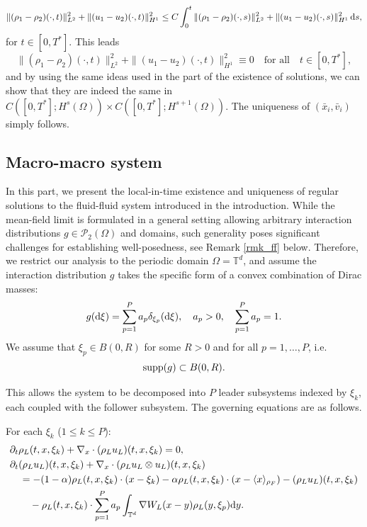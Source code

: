 \documentclass[10pt, reqno]{amsart}
\theoremstyle{definition}
\theoremstyle{remark}
\numberwithin{equation}{section}
\newcommand{\dy}{\textnormal{d}y}
\newcommand{\ds}{\textnormal{d}s}
\newcommand{\dxi}{\textnormal{d}\xi}
\newcommand{\calP}{\mathcal P}
\newcommand{\T}{\mathbb{T}}
\newcommand{\p}{\partial}
\begin{document}
\[
\|(\rho_1 - \rho_2)(\cdot,t)\|_{L^2}^2 + \|(u_1 - u_2)(\cdot,t)\|_{H^1}^2 \leq C\int_0^t \|(\rho_1 - \rho_2)(\cdot,s)\|_{L^2}^2 + \|(u_1 - u_2)(\cdot,s)\|_{H^1}^2\,\ds,
\] 
for $t \in [0,T^*]$. This leads
\[
\|(\rho_1 - \rho_2)(\cdot,t)\|_{L^2}^2 + \|(u_1 - u_2)(\cdot,t)\|_{H^1}^2 \equiv 0 \quad \mbox{for all} \quad t \in [0,T^*],
\]
and by using the same ideas used in the part of the existence of solutions, we can show that they are indeed the same in $C([0,T^*];H^s(\Omega)) \times C([0,T^*];H^{s+1}(\Omega))$. The uniqueness of $(\bar x_i, \bar v_i)$ simply follows. 


%
%
%
%
%
\subsection{Macro-macro system}\label{app_ffs}
In this part, we present the local-in-time existence and uniqueness of regular solutions to the fluid-fluid system introduced in the introduction. While the mean-field limit is formulated in a general setting allowing arbitrary interaction distributions $g \in \calP_2(\Omega)$ and domains, such generality poses significant challenges for establishing well-posedness, see Remark \ref{rmk_ff} below. Therefore, we restrict our analysis to the periodic domain $\Omega = \T^d$, and assume the interaction distribution $g$ takes the specific form of a convex combination of Dirac masses:
\begin{align*}
    g(\dxi) = \sum_{p=1}^P a_p \delta_{\xi_p}(\dxi), \quad a_p > 0, \quad \sum_{p=1}^P a_p = 1.
\end{align*}
We assume that $\xi_p \in B(0,R)$ for some $R>0$ and for all $p=1, \dots, P$, i.e.
\[
{\rm supp} (g) \subset B(0,R).
\]
 
This allows the system to be decomposed into $P$ leader subsystems indexed by $\xi_k$, each coupled with the follower subsystem. The governing equations are as follows.

For each $\xi_k$ ($1 \le k \le P$):
\begin{equation}\label{eq: macmac xi_k}
    \begin{split}
        &\p_t \rho_L(t,x,\xi_k) + \nabla_x\cdot (\rho_L u_L) (t,x,\xi_k) = 0,\\
        &\p_t (\rho_L u_L)(t,x,\xi_k) + \nabla_x\cdot (\rho_L u_L \otimes u_L) (t,x,\xi_k) \\
        &\quad = -(1-\alpha) \rho_L(t,x,\xi_k) \cdot (x-\xi_k)  - \alpha \rho_L(t,x,\xi_k) \cdot (x-\langle x \rangle_{\rho_F}) - (\rho_L u_L) (t,x,\xi_k) \\
        &\qquad - \rho_L(t,x,\xi_k) \cdot \sum_{p=1}^P a_p \int_{\T^{d}} \nabla W_L(x-y)\rho_L(y,\xi_p) \dy.
    \end{split}
\end{equation}
\end{document}
